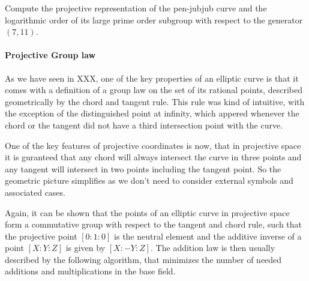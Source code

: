 \begin{exercise}
Compute the projective representation of the pen-jubjub curve and the logarithmic order of its large prime order subgroup with respect to the generator $(7,11)$.
\end{exercise}
\paragraph{Projective Group law}
As we have seen in XXX, one of the key properties of an elliptic curve is that it comes with a definition of a group law on the set of its rational points, described geometrically by the chord and tangent rule. This rule was kind of intuitive, with the exception of the distinguished point at infinity, which appered whenever the chord or the tangent did not have a third intersection point with the curve.

One of the key features of projective coordinates is now, that in projective space it is guranteed that any chord will always intersect the curve in three points and any tangent will intersect in two points including the tangent point. So the geometric picture simplifies as we don't need to consider external symbols and associated cases.

Again, it can be shown that the points of an elliptic curve in projective space form a commutative group with respect to the tangent and chord rule, such that the projective point $[0:1:0]$ is the neutral element and the additive inverse of a point $[X:Y:Z]$ is given by $[X:-Y:Z]$. The addition law is then usually described by the following algorithm, that minimizes the number of needed additions and multiplications in the base field.

